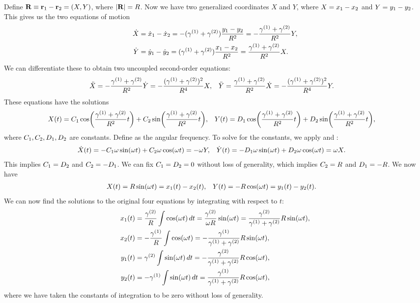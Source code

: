 \begin{solution}
	Define $\mathbf{R} \equiv \mathbf{r}_1 - \mathbf{r}_2 = (X, Y)$, where $|\mathbf{R}| = R$.  Now we have two generalized coordinates $X$ and $Y$, where $X = x_1 - x_2$ and $Y = y_1 - y_2$.  This gives us the two equations of motion
	\begin{align}
		\dot{X} &= \dot{x}_1 - \dot{x}_2
		= -(\gamma^{(1)} + \gamma^{(2)}) \frac{y_1 - y_2}{R^2}
		= -\frac{\gamma^{(1)} + \gamma^{(2)}}{R^2} Y, \label{eqnX} \\
		\dot{Y} &= \dot{y}_1 - \dot{y}_2
		= (\gamma^{(1)} + \gamma^{(2)}) \frac{x_1 - x_2}{R^2}
		= \frac{\gamma^{(1)} + \gamma^{(2)}}{R^2} X. \label{eqnY}
	\end{align}
	We can differentiate these to obtain two uncoupled second-order equations:
	\begin{align*}
		\ddot{X} &= -\frac{\gamma^{(1)} + \gamma^{(2)}}{R^2} \dot{Y}
		= -\frac{(\gamma^{(1)} + \gamma^{(2)})^2}{R^4} X, &
		\ddot{Y} &= \frac{\gamma^{(1)} + \gamma^{(2)}}{R^2} \dot{X}
		= -\frac{(\gamma^{(1)} + \gamma^{(2)})^2}{R^4} Y.
	\end{align*}
	These equations have the solutions
	\begin{align*}
		X(t) &= C_1 \cos(\frac{\gamma^{(1)} + \gamma^{(2)}}{R^2} t) + C_2 \sin(\frac{\gamma^{(1)} + \gamma^{(2)}}{R^2} t), &
		Y(t) &= D_1 \cos(\frac{\gamma^{(1)} + \gamma^{(2)}}{R^2} t) + D_2 \sin(\frac{\gamma^{(1)} + \gamma^{(2)}}{R^2} t),
	\end{align*}
	where $C_1, C_2, D_1, D_2$ are constants.  Define
	\beqn \label{omg}
		\omg \equiv {}
	\eeqn
	as the angular frequency.  To solve for the constants, we apply  and :
	\begin{align*}
		\dot{X}(t) &= -C_1 \omega \sin(\omega t) + C_2 \omega \cos(\omega t) = -\omega Y, &
		\dot{Y}(t) &= -D_1 \omega \sin(\omega t) + D_2 \omega \cos(\omega t) = \omega X.
	\end{align*}
	This implies $C_1 = D_2$ and $C_2 = -D_1$.  We can fix $C_1 = D_2 = 0$ without loss of generality, which implies $C_2 = R$ and $D_1 = -R$.  We now have
	\begin{align} \label{2eqns}
		X(t) &= R \sin(\omega t) = x_1(t) - x_2(t), &
		Y(t) &= -R \cos(\omega t) = y_1(t) - y_2(t).
	\end{align}
	We can now find the solutions to the original four equations by integrating  with respect to $t$:
	\begin{align*}
		x_1(t) &= \frac{\gamma^{(2)}}{R} \int \cos(\omega t) \dd{t}
		= \frac{\gamma^{(2)}}{\omega R} \sin(\omega t)
		= \frac{\gamma^{(2)}}{\gamma^{(1)} + \gamma^{(2)}} R \sin(\omega t), \\
		x_2(t) &= -\frac{\gamma^{(1)}}{R} \int \cos(\omega t)
		= -\frac{\gamma^{(1)}}{\gamma^{(1)} + \gamma^{(2)}} R \sin(\omega t), \\
		y_1(t) &= \gamma^{(2)} \int \sin(\omega t) \dd{t}
		= -\frac{\gamma^{(2)}}{\gamma^{(1)} + \gamma^{(2)}} R \cos(\omega t), \\
		y_2(t) &= -\gamma^{(1)} \int \sin(\omega t) \dd{t}
		= \frac{\gamma^{(1)}}{\gamma^{(1)} + \gamma^{(2)}} R \cos(\omega t),
	\end{align*}
	where we have taken the constants of integration to be zero without loss of generality.


\end{solution}
